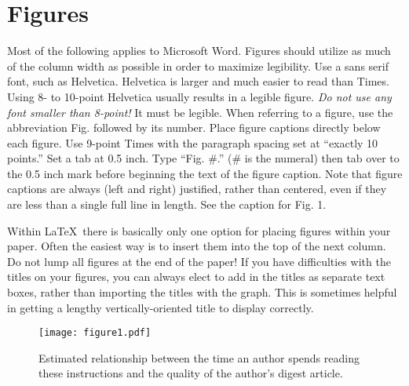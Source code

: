 \documentclass[conference]{IEEEtran}
\begin{document}
{\section{Figures}
Most of the following applies to Microsoft Word.  Figures should utilize as much of the column width as possible in order to maximize legibility. Use a sans serif font, such as Helvetica. Helvetica is larger and much easier to read than Times. Using 8- to 10-point Helvetica usually results in a legible figure. {\itshape Do not use any font smaller than 8-point!} It must be legible. When referring to a figure, use the abbreviation Fig. followed by its number. Place figure captions directly below each figure. Use
9-point Times with the paragraph spacing set at ``exactly 10 points.'' Set a tab at 0.5 inch. Type ``Fig. \#.'' (\# is the numeral) then tab over to the 0.5 inch mark before beginning the text of the figure caption. Note that figure captions are always (left and right) justified, rather than centered, even if they are less than a single full line in length. See the caption for Fig. 1.

Within \LaTeX\ there is basically only one option for placing figures
within your paper.  Often the easiest way is to insert them into the
top of the next column.
Do not lump all figures at the end of the paper!
If you have difficulties with the titles on your figures, you can always elect to add in the titles as separate text boxes, rather than importing the titles with the graph. This is sometimes helpful in getting a lengthy vertically-oriented title to display correctly.
\begin{figure}
\texttt{[image: figure1.pdf]}
\caption{ Estimated relationship between the time an author spends reading these instructions and the quality of the author's digest article.}
\end{figure}

}
\end{document}
